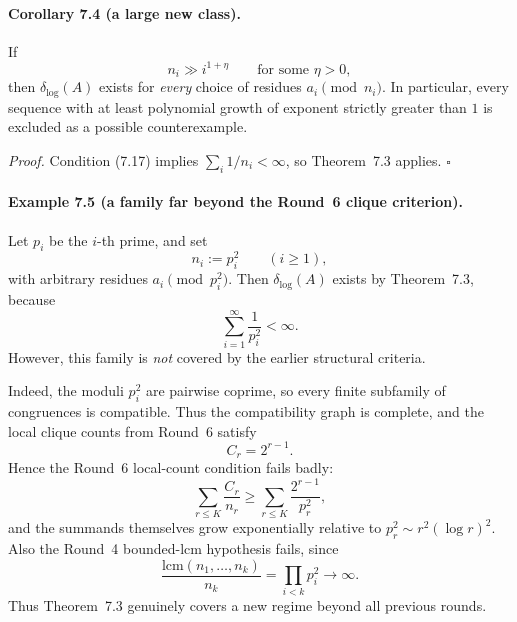 \paragraph{Corollary 7.4 (a large new class).}
If
\begin{equation}
n_i\gg i^{1+\eta}\qquad\text{for some }\eta>0,
\tag{7.17}
\end{equation}
then \(\delta_{\log}(A)\) exists for \emph{every} choice of residues \(a_i\pmod{n_i}\).
In particular, every sequence with at least polynomial growth of exponent strictly greater than \(1\) is excluded as a
possible counterexample.

\emph{Proof.}
Condition (7.17) implies \(\sum_i 1/n_i<\infty\), so Theorem~7.3 applies.  \hfill \(\square\)

\paragraph{Example 7.5 (a family far beyond the Round~6 clique criterion).}
Let \(p_i\) be the \(i\)-th prime, and set
\begin{equation}
n_i:=p_i^2\qquad(i\ge 1),
\tag{7.18}
\end{equation}
with arbitrary residues \(a_i\pmod{p_i^2}\).
Then \(\delta_{\log}(A)\) exists by Theorem~7.3, because
\[
\sum_{i=1}^{\infty}\frac{1}{p_i^2}<\infty.
\]
However, this family is \emph{not} covered by the earlier structural criteria.

Indeed, the moduli \(p_i^2\) are pairwise coprime, so every finite subfamily of congruences is compatible.  Thus the
compatibility graph is complete, and the local clique counts from Round~6 satisfy
\begin{equation}
C_r=2^{r-1}.
\tag{7.19}
\end{equation}
Hence the Round~6 local-count condition fails badly:
\[
\sum_{r\le K}\frac{C_r}{n_r}
\ge
\sum_{r\le K}\frac{2^{r-1}}{p_r^2},
\]
and the summands themselves grow exponentially relative to \(p_r^2\sim r^2(\log r)^2\).
Also the Round~4 bounded-lcm hypothesis fails, since
\[
\frac{\mathrm{lcm}(n_1,\dots,n_k)}{n_k}
=
\prod_{i<k}p_i^2
\to\infty.
\]
Thus Theorem~7.3 genuinely covers a new regime beyond all previous rounds.

